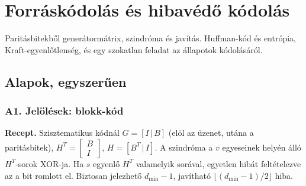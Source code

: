 \setcounter{chapter}{5}
\chapter{\texorpdfstring{Forráskódolás és hibavédő kódolás}{Forráskódolás és hibavédő kódolás}}\label{f6}
Paritásbitekből generátormátrix, szindróma és javítás. Huffman-kód és entrópia, Kraft-egyenlőtlenség, és egy szokatlan feladat az állapotok kódolásáról.

\section{Alapok, egyszerűen}
\subsection{\texorpdfstring{A1. Jelölések: blokk-kód}{A1. Jelölések: blokk-kód}}\label{b6-jel}
\par{}\par

\textbf{Recept.} Szisztematikus kódnál $G=[I\,|\,B]$ (elöl az üzenet, utána a paritásbitek), $H^T=\begin{bmatrix}B\\I\end{bmatrix}$, $H=[B^T\,|\,I]$. A szindróma a $v$ egyeseinek helyén álló $H^T$-sorok XOR-ja. Ha $s$ egyenlő $H^T$ valamelyik sorával, egyetlen hibát feltételezve az a bit romlott el. Biztosan jelezhető $d_{\min}-1$, javítható $\lfloor(d_{\min}-1)/2\rfloor$ hiba.

